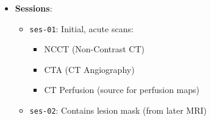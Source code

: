 \documentclass[a4paper,12pt]{article}
\begin{document}
\begin{itemize}
    \item \textbf{Sessions}:
    \begin{itemize}
        \item \texttt{ses-01}: Initial, acute scans:
        \begin{itemize}
            \item NCCT (Non-Contrast CT)
            \item CTA (CT Angiography)
            \item CT Perfusion (source for perfusion maps)
        \end{itemize}
        \item \texttt{ses-02}: Contains lesion mask (from later MRI)
    \end{itemize}

\end{itemize}
\end{document}
